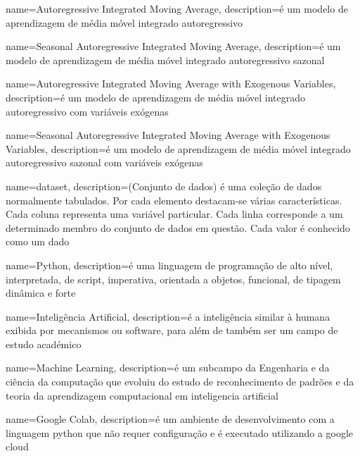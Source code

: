 {
    name={Autoregressive Integrated Moving Average},
    description={é um modelo de aprendizagem de média móvel integrado autoregressivo}
}

{
    name={Seasonal Autoregressive Integrated Moving Average},
    description={é um modelo de aprendizagem de média móvel integrado autoregressivo
    sazonal}
}

{
    name={Autoregressive Integrated Moving Average with Exogenous Variables},
    description={é um modelo de aprendizagem de média móvel integrado autoregressivo
    com variáveis exógenas}
}

{
    name={Seasonal Autoregressive Integrated Moving Average with Exogenous Variables},
    description={é um modelo de aprendizagem de média móvel integrado autoregressivo
    sazonal com variáveis exógenas}
}

{
    name={dataset},
    description={(Conjunto de dados) é uma coleção de dados normalmente tabulados. Por
    cada elemento destacam-se várias características. Cada coluna representa uma
    variável particular. Cada linha corresponde a um determinado membro do conjunto de
    dados em questão. Cada valor é conhecido como um dado}
}

{
    name={Python},
    description={é uma linguagem de programação de alto nível, interpretada, de script,
    imperativa, orientada a objetos, funcional, de tipagem dinâmica e forte}
}

{
    name={Inteligência Artificial},
    description={é a inteligência similar à humana exibida por mecanismos ou software,
    para além de também ser um campo de estudo académico}
}

{
    name={Machine Learning},
    description={é um subcampo da Engenharia e da ciência da computação que evoluiu do
    estudo de reconhecimento de padrões e da teoria da aprendizagem computacional em
    \gls{inteligencia artificial}}
}

{
    name={Google Colab},
    description={é um ambiente de desenvolvimento com a linguagem \gls{python} que não
    requer configuração e é executado utilizando a \gls{google cloud}}
}

